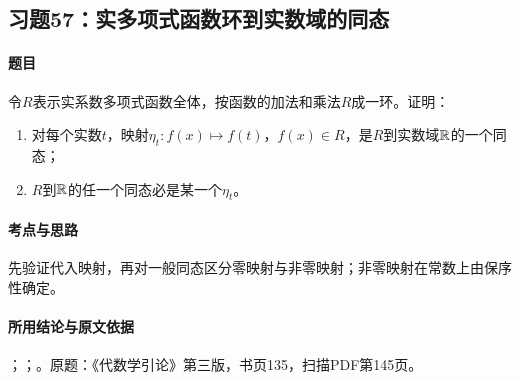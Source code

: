 \subsection{习题57：实多项式函数环到实数域的同态}

\label{ex:3:57}

\paragraph{题目}

令$R$表示实系数多项式函数全体，按函数的加法和乘法$R$成一环。证明：
\begin{enumerate}[label=(\roman*)]
\item 对每个实数$t$，映射$\eta_t:f(x)\mapsto f(t)$，$f(x)\in R$，是$R$到实数域$\mathbb R$的一个同态；
\item $R$到$\mathbb R$的任一个同态必是某一个$\eta_t$。
\end{enumerate}

\paragraph{考点与思路}

先验证代入映射，再对一般同态区分零映射与非零映射；非零映射在常数上由保序性确定。

\paragraph{所用结论与原文依据}

；；。原题：《代数学引论》第三版，书页135，扫描PDF第145页。


